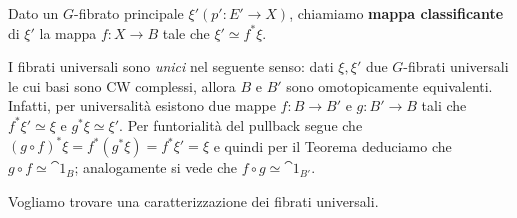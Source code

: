 



Dato un $G$-fibrato principale $\xi'(p':E' \to X)$,
chiamiamo \textbf{mappa classificante} di $\xi'$
la mappa $f:X \to B$ tale che $\xi' \simeq f^{*}\xi$.

\begin{oss}
	I fibrati universali sono \emph{unici} nel seguente senso:	
	dati $\xi, \xi'$ due $G$-fibrati universali le cui basi sono
	CW complessi, allora $B$ e $B'$ sono omotopicamente equivalenti.
	Infatti, per universalità esistono due mappe 
	$f:B \to B'$ e $g:B' \to B$ tali che $f^{*}\xi' \simeq \xi$
	e $ g^{*}\xi \simeq \xi'$.  Per funtorialità del pullback
	segue che $(g \circ f)^{*}\xi = f^{*}(g^{*}\xi) = f^{*} \xi' = \xi$
	e quindi per il Teorema deduciamo che $g \circ f \simeq \cat{1}_{B}$;
	analogamente si vede che $f \circ g \simeq \cat{1}_{B'}$.
\end{oss}

Vogliamo trovare una caratterizzazione dei fibrati universali.

